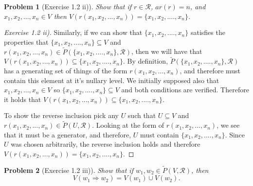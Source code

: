\documentclass{article}
\theoremstyle{problemstyle}
\newtheorem{problem}{Problem}
\begin{document}
\begin{problem}[Exercise 1.2 ii)] 
Show that if $r \in \mathscr{R}$, $ar(r) = n$, and $x_1,x_2,...,x_n \in V$ then $V(r(x_1,x_2,...,x_n)) = \{x_1,x_2,....,x_n\}$.
\end{problem}

\begin{proof}[Exercise 1.2 ii)]
Similarly, if we can show that $\{x_1,x_2,....,x_n\}$ satisfies the properties that $\{x_1,x_2,....,x_n\} \subseteq V$ and $r(x_1,x_2,...,x_n) \in \widetilde{P}(\{x_1,x_2,....,x_n\},\mathscr{R})$, then we will have that $V(r(x_1,x_2,...,x_n)) \subseteq \{x_1,x_2,....,x_n\}$. By definition, $\widetilde{P}(\{x_1,x_2,....,x_n\},\mathscr{R})$ has a generating set of things of the form $r(x_1,x_2,...,x_n)$, and therefore must contain this element at it's nullary level. We initially supposed also that $x_1,x_2,...,x_n \in V$ so $\{x_1,x_2,....,x_n\} \subseteq V$ and both conditions are verified. Therefore it holds that $V(r(x_1,x_2,...,x_n)) \subseteq \{x_1,x_2,....,x_n\}$. 

To show the reverse inclusion pick any $U$ such that $U \subseteq V$ and $r(x_1,x_2,...,x_n) \in \widetilde{P}(U,\mathscr{R})$. Looking at the form of $r(x_1,x_2,...,x_n)$, we see that it must be a generator, and therefore, $U$ must contain $\{x_1,x_2,....,x_n\}$. Since $U$ was chosen arbitrarily, the reverse inclusion holds and therefore $V(r(x_1,x_2,...,x_n)) = \{x_1,x_2,....,x_n\}$.
\end{proof}

\begin{problem}[Exercise 1.2 iii)] 
Show that if $w_1,w_2 \in \widetilde{P}(V,\mathscr{R})$, then $$V(w_1\Rightarrow w_2) = V(w_1) \cup V(w_2).$$
\end{problem}
\end{document}
